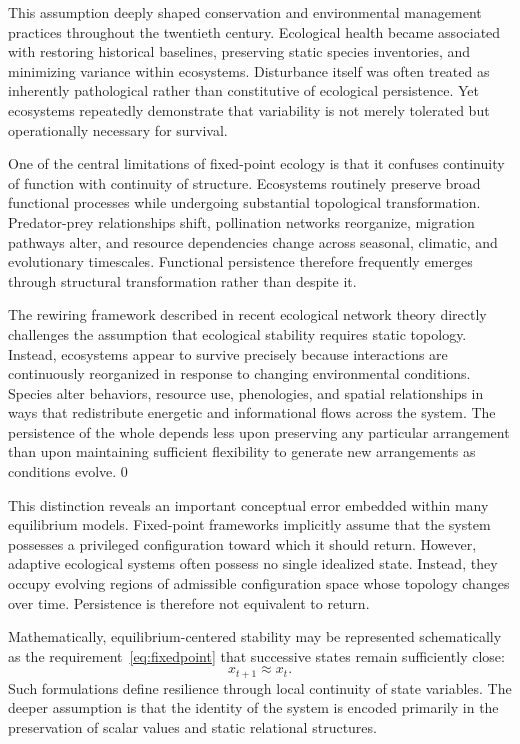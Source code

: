 \documentclass[11pt,a4paper]{article}
\begin{document}
This assumption deeply shaped conservation and environmental management practices throughout the twentieth century. Ecological health became associated with restoring historical baselines, preserving static species inventories, and minimizing variance within ecosystems. Disturbance itself was often treated as inherently pathological rather than constitutive of ecological persistence. Yet ecosystems repeatedly demonstrate that variability is not merely tolerated but operationally necessary for survival.

One of the central limitations of fixed-point ecology is that it confuses continuity of function with continuity of structure. Ecosystems routinely preserve broad functional processes while undergoing substantial topological transformation. Predator-prey relationships shift, pollination networks reorganize, migration pathways alter, and resource dependencies change across seasonal, climatic, and evolutionary timescales. Functional persistence therefore frequently emerges through structural transformation rather than despite it.

The rewiring framework described in recent ecological network theory directly challenges the assumption that ecological stability requires static topology. Instead, ecosystems appear to survive precisely because interactions are continuously reorganized in response to changing environmental conditions. Species alter behaviors, resource use, phenologies, and spatial relationships in ways that redistribute energetic and informational flows across the system. The persistence of the whole depends less upon preserving any particular arrangement than upon maintaining sufficient flexibility to generate new arrangements as conditions evolve. 0

This distinction reveals an important conceptual error embedded within many equilibrium models. Fixed-point frameworks implicitly assume that the system possesses a privileged configuration toward which it should return. However, adaptive ecological systems often possess no single idealized state. Instead, they occupy evolving regions of admissible configuration space whose topology changes over time. Persistence is therefore not equivalent to return.

Mathematically, equilibrium-centered stability may be represented schematically as the requirement~\eqref{eq:fixedpoint} that successive states remain sufficiently close:
\[
x_{t+1} \approx x_t.
\]
Such formulations define resilience through local continuity of state variables. The deeper assumption is that the identity of the system is encoded primarily in the preservation of scalar values and static relational structures.
\end{document}

